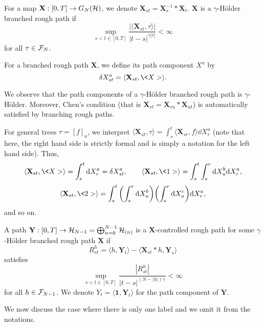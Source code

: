 \documentclass[11pt]{style/preprint}
\begin{document}
\begin{definition}
  For a map \(\mathbf{X} : [0, T] \to G_N({\mathcal H})\), we denote \(\mathbf{X}_{st} = \mathbf{X}^{-1}_s * \mathbf{X}_t\).
  \(\mathbf{X}\) is a \(\gamma\)-H\"older branched rough path if 
  \[\sup_{s < t \in [0, T]} \frac{|\langle \mathbf{X}_{st}, \tau\rangle|} {|t - s|^{\gamma|\tau|}} < \infty\]
  for all \(\tau \in {\mathcal F}_N\).

  For a branched rough path \(\mathbf{X}\), we define its path component \(X^a\) by 
  \[\delta X^a_{st} = \langle \mathbf{X}_{st}, \<X>\rangle.\]
\end{definition}

We observe that the path components of a \(\gamma\)-H\"older branched rough path is \(\gamma\)-H\"older. 
Moreover, Chen's condition (that is \(\mathbf{X}_{st} = \mathbf{X}_{su} * \mathbf{X}_{ut}\)) is automatically 
satisfied by branching rough paths. 

For general trees \(\tau = [f]_a\), we interpret \(\langle \mathbf{X}_{st}, \tau\rangle = 
  \int_s^t \langle \mathbf{X}_{sr}, f\rangle \dd X^a_r\) (note that here, the right hand side is strictly 
formal and is simply a notation for the left hand side). Thus, 
\[\langle \mathbf{X}_{st}, \<X> \rangle = \int_s^t \dd X^a_r = \delta X^a_{st}, \qquad
  \langle \mathbf{X}_{st}, \<1> \rangle = \int_s^t \int_s^r \dd X^b_u \dd X^a_r,\]
\[\langle \mathbf{X}_{st}, \<2>\rangle = \int_s^t \left(\int_s^r \dd X^b_u\right) \left(\int_s^r \dd X^c_u\right) \dd X^a_r,\] 
and so on.

\begin{definition}
  A path \(\mathbf{Y} : [0, T] \to {\mathcal H}_{N - 1} = \bigoplus_{n = 0}^{N - 1} {\mathcal H}_{(n)}\) is a 
  \(\mathbf{X}\)-controlled rough path for some \(\gamma\)-H\"older branched rough path \(\mathbf{X}\) if 
  \[R^h_{st} = \langle h, \mathbf{Y}_t\rangle - \langle \mathbf{X}_{st} * h, \mathbf{Y}_s\rangle\]
  satisfies 
  \[\sup_{s < t \in [0, T]} \frac{|R^h_{st}|}{|t - s|^{(N - |h|)\gamma}} < \infty\] 
  for all \(h \in {\mathcal F}_{N - 1}\). We denote \(Y_t = \langle \mathbf{1}, \mathbf{Y}_t\rangle\) for the 
  path component of \(\mathbf{Y}\).
\end{definition}

We now discuss the case where there is only one label and we omit it from the notations.
\end{document}
